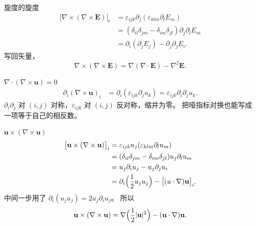 \documentclass[fontset=windows, chinese, 10pt, xcolor=dvipsnames]{beamer}
\begin{document}
\begin{frame}{旋度的旋度}
  \begin{align*}
    \bigl[\nabla\times(\nabla\times\mathbf{E})\bigr]_i
    &= \varepsilon_{ijk}\partial_j(\varepsilon_{klm}\partial_l E_m) \\
    &= (\delta_{il}\delta_{jm}-\delta_{im}\delta_{jl})
       \partial_j\partial_l E_m \\
    &= \partial_i(\partial_j E_j)
     - \partial_j\partial_j E_i.
  \end{align*}
  写回矢量，
  \begin{equation*}
    \nabla\times(\nabla\times\mathbf{E})
    =\nabla(\nabla\cdot\mathbf{E})-\nabla^2\mathbf{E}.
  \end{equation*}
\end{frame}

\begin{frame}{$\nabla\cdot(\nabla\times\mathbf{u})=0$}
  \begin{align*}
    \partial_i(\nabla\times\mathbf{u})_i
    &= \partial_i(\varepsilon_{ijk}\partial_j u_k)
     = \varepsilon_{ijk}\partial_i\partial_j u_k.
  \end{align*}
  $\partial_i\partial_j$ 对 $(i,j)$ 对称，$\varepsilon_{ijk}$ 对 $(i,j)$ 反对称，缩并为零。
  把哑指标对换也能写成一项等于自己的相反数。
\end{frame}

\begin{frame}{$\mathbf{u}\times(\nabla\times\mathbf{u})$}
  \small
  \begin{align*}
    \bigl[\mathbf{u}\times(\nabla\times\mathbf{u})\bigr]_i
    &= \varepsilon_{ijk}u_j(\varepsilon_{klm}\partial_l u_m) \\
    &= (\delta_{il}\delta_{jm}-\delta_{im}\delta_{jl})
       u_j\partial_l u_m \\
    &= u_j\partial_i u_j - u_j\partial_j u_i \\
    &= \partial_i\Bigl(\frac12 u_j u_j\Bigr)
     - \bigl[(u\cdot\nabla)\mathbf{u}\bigr]_i.
  \end{align*}
  \normalsize
  中间一步用了
  $\partial_i(u_j u_j)=2u_j\partial_i u_j$。
  所以
  \begin{equation*}
    \mathbf{u}\times(\nabla\times\mathbf{u})
    =\nabla\Bigl(\frac12|\mathbf{u}|^2\Bigr)
    -(\mathbf{u}\cdot\nabla)\mathbf{u}.
  \end{equation*}
\end{frame}
\end{document}
